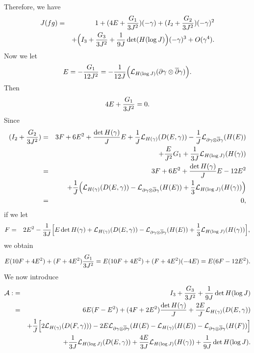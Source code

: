 \documentclass[12pt]{amsart}
\def\d{\partial}
\def\dbar{\overline{\partial}}
\def\d{\partial}
\def\cal{\mathcal}
\begin{document}
Therefore,
we have
\begin{eqnarray}
J(fg)&=&1+(4E+{G_1\over 3J^2})(-\gamma)+(I_2+{G_2\over 3 J^2})
(-\gamma)^2\nonumber\\
&&+\Big(I_3+{G_3\over 3 J^2}+{1 \over 9J}\det (H(\log J)\Big)(-\gamma)^3+O(\gamma^4).
\end{eqnarray}
Now we let
\begin{eqnarray}
E=-{G_1\over 12 J^2}=-{1\over 12 J}  \Big({\cal L}_{H(\log J)}(\d \gamma \otimes \dbar \gamma)\Big).
\end{eqnarray}
Then
$$
4E+{G_1\over 3 J^2}=0.
$$
Since
\begin{eqnarray*}
(I_2+{G_2\over 3 J^2})&=&3F+6E^2+{ \det H(\gamma)\over J} E+
{1\over J}{\cal L}_{H(\gamma)}(D(E, \gamma))-{1\over J}{\cal L}_{\d \gamma \otimes \dbar \gamma}(H(E))\\
&&+{E\over J^2} G_1 +{1\over 3 J}{\cal L}_{H(\log J)}(H(\gamma))\\
&=&3F+6E^2+{\det H(\gamma)\over J} E -12 E^2\\
&&+{1\over J} \Big({\cal L}_{H(\gamma)}(D(E, \gamma))-{\cal L}_{\d \gamma \otimes \dbar \gamma}(H(E))
+{1\over 3 }{\cal L}_{H(\log J)}(H(\gamma))\Big)\\
&=& 0,
\end{eqnarray*}
if we let
\begin{eqnarray*}
F&=&2E^2- {1 \over 3 J} \Big[ E  \det H(\gamma)+
{\cal L}_{H(\gamma)}(D(E, \gamma))-{\cal L}_{\d \gamma \otimes \dbar \gamma}(H(E))
+{1\over 3 }{\cal L}_{H(\log J)}(H(\gamma))\Big],
\end{eqnarray*}
we obtain
$$
E(10F+4E^2)+(F+4E^2){G_1\over 3J^2}=E(10F+4E^2)+(F+4E^2)(-4E)=E(6F-12 E^2).
$$
We now introduce
\begin{eqnarray*}
{\cal A}:&=& I_3+{G_3\over 3J^2}+{1\over 9J} \det H(\log J)\\
&=&6 E(F-E^2) +(4F+2E^2) {\det H(\gamma)\over J} +{2E \over J} {\cal L}_{H(\gamma)}(D(E, \gamma))\\
&&+ {1\over J} \Big[ 2 {\cal L}_{H(\gamma)} ( D(F, \gamma) ) ) -2E {\cal L}_{\d \gamma \otimes \dbar \gamma}(H(E)-{\cal L }_{H(\gamma)}(H(E)) 
-{\cal L}_{\d \gamma \otimes \dbar \gamma}(H(F)) \Big]\\
&&+{1\over 3J}  {\cal L}_{H(\log J)}(D(E, \gamma))+{4E \over 3 J}  {\cal L}_{H(\log J)}(H(\gamma))
+{1\over 9J } \det H(\log J).
\end{eqnarray*}
\end{document}
